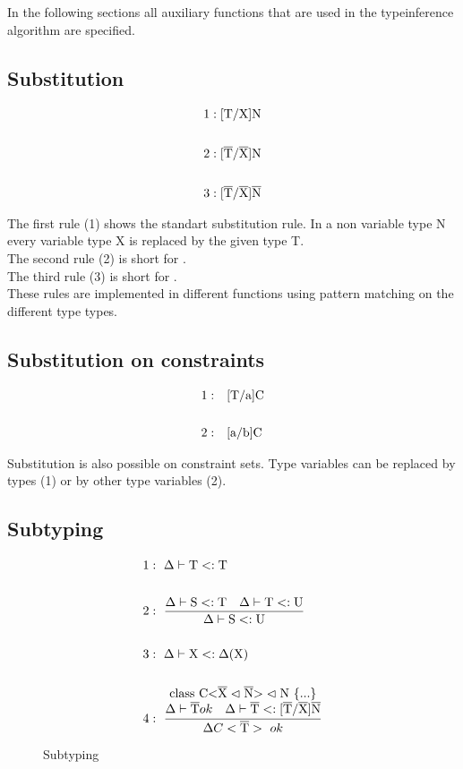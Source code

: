 In the following sections all auxiliary functions that are used in the typeinference algorithm are specified.

\subsection{Substitution}

\begin{align*}
1&: \text{[T/X]N}
\\
\\
2&: \text{[}\overline{\text{T}}/\overline{\text{X}}\text{]N}
\\
\\
3&: \text{[}\overline{\text{T}}/\overline{\text{X}}\text{]}\overline{\text{N}}
\end{align*}

The first rule (1) shows the standart substitution rule. In a non variable type N every variable type X is replaced by the given type T.
\\
The second rule (2) is short for .
\\
The third rule (3) is short for .
\\
These rules are implemented in different functions using pattern matching on the different type types.

\subsection{Substitution on constraints}

\begin{align*}
    1:& \quad \text{[T/a]C}\\
    \\
    2:& \quad \text{[a/b]C}
\end{align*}

Substitution is also possible on constraint sets. Type variables can be replaced by types (1) or by other type variables (2).

\subsection{Subtyping}

\begin{figure}[H]
    \begin{align*}
1&: \ \Delta \vdash \text{T} <: \text{T}
\\
\\
2&: \ \frac{\Delta \vdash \text{S} <: \text{T} \quad \Delta \vdash \text{T} <: \text{U}}{\Delta \vdash \text{S} <: \text{U}}
\\
\\
3&: \ \Delta \vdash \text{X} <: \Delta(\text{X})
\\
\\
4&: \ \frac{
    \begin{matrix}
        \text{class C<} \overline{\text{X}} \vartriangleleft \overline{\text{N}} \text{>} \vartriangleleft \text{N} \ \{...\} \\
        \Delta \vdash \overline{\text{T}} ok \quad \Delta \vdash \overline{\text{T}} <: \text{[}\overline{\text{T}}/\overline{\text{X}}\text{]}\overline{\text{N}}
    \end{matrix}}
    {\Delta C<\overline{\text{T}}> \ ok}
    \end{align*}
    \caption{Subtyping}
    \label{subtyping}
\end{figure}

